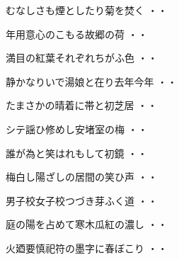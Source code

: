 \vspace{0.6cm}
\begin{shiika}むなしさも煙としたり菊を焚く
\hfill{・・}\end{shiika}
\vspace{0.6cm}
\begin{shiika}年用意心のこもる故郷の荷
\hfill{・・}\end{shiika}
\vspace{0.6cm}
\begin{shiika}満目の紅葉それぞれちがふ色
\hfill{・・}\end{shiika}
\vspace{0.6cm}
\begin{shiika}静かなりいで湯娘と在り去年今年
\hfill{・・}\end{shiika}
\vspace{0.6cm}
\begin{shiika}たまさかの晴着に帯と初芝居
\hfill{・・}\end{shiika}
\vspace{0.6cm}
\begin{shiika}シテ謡ひ修めし安堵室の梅
\hfill{・・}\end{shiika}
\vspace{0.6cm}
\begin{shiika}誰が為と笑はれもして初鏡
\hfill{・・}\end{shiika}
\vspace{0.6cm}
\begin{shiika}梅白し陽ざしの居間の笑ひ声
\hfill{・・}\end{shiika}
\vspace{0.6cm}
\begin{shiika}男子校女子校つづき芽ふく道
\hfill{・・}\end{shiika}
\vspace{0.6cm}
\begin{shiika}庭の陽を占めて寒木瓜紅の濃し
\hfill{・・}\end{shiika}
\vspace{0.6cm}
\begin{shiika}火廼要慎祀符の墨字に春ぼこり
\hfill{・・}\end{shiika}
